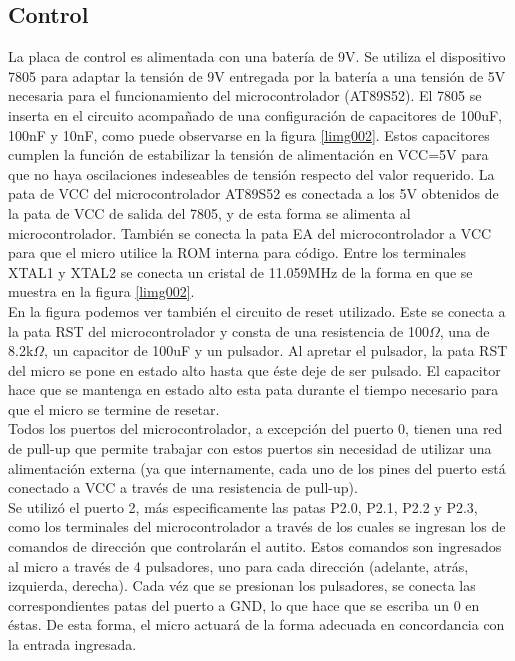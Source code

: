 \documentclass[a4paper,10pt]{article}
\begin{document}
		\subsection{Control}
			La placa de control es alimentada con una batería de 9V. Se utiliza el
			dispositivo 7805 para adaptar la tensión de 9V entregada por la batería
			a una tensión de 5V necesaria para el funcionamiento del microcontrolador (AT89S52).
			El 7805 se inserta en el circuito acompañado de una configuración de capacitores de
			100uF, 100nF y 10nF, como puede observarse en la figura \ref{limg002}. Estos 						capacitores cumplen la función de estabilizar la tensión de alimentación en VCC=5V para 			que no haya oscilaciones indeseables de tensión respecto del valor requerido.
			La pata de VCC del microcontrolador AT89S52 es conectada a los 5V obtenidos de
			la pata de VCC de salida del 7805, y de esta forma se alimenta al microcontrolador. 				También se conecta la pata EA del microcontrolador a VCC para que el micro utilice la 				ROM interna para código. Entre los terminales XTAL1 y XTAL2 se conecta un cristal de 				11.059MHz de la forma en que se muestra en la figura \ref{limg002}.\\
			\indent En la figura podemos ver también el circuito de reset utilizado. Este se 					conecta a la pata RST del microcontrolador y consta de una resistencia de 100$\Omega$, 				una de 8.2k$\Omega$, un capacitor de 100uF y un pulsador. Al apretar el pulsador, la 				pata RST del micro se pone en estado alto hasta que éste deje de ser pulsado. El 					capacitor hace que se mantenga en estado alto esta pata durante el tiempo necesario 				para que el micro se termine de resetar.\\
			\indent Todos los puertos del microcontrolador, a excepción del puerto 0, tienen una 
			red de pull-up que permite trabajar con estos puertos sin necesidad de utilizar una 				alimentación externa (ya que internamente, cada uno de los pines del puerto está 					conectado a VCC a través de una resistencia de pull-up).\\
			\indent Se utilizó el puerto 2, más especificamente las patas P2.0, P2.1, P2.2 y P2.3,
			como los terminales del microcontrolador a través de los cuales se ingresan los 					de comandos de dirección que controlarán el autito. Estos comandos son ingresados al 				micro a través de 4 pulsadores, uno para cada dirección (adelante, atrás, izquierda, 				derecha). Cada véz que se presionan los pulsadores, se conecta las correspondientes 				patas del puerto a GND, lo que hace que se escriba un 0 en éstas. De esta forma, el 				micro actuará de la forma adecuada en concordancia con la entrada ingresada.
\end{document}
